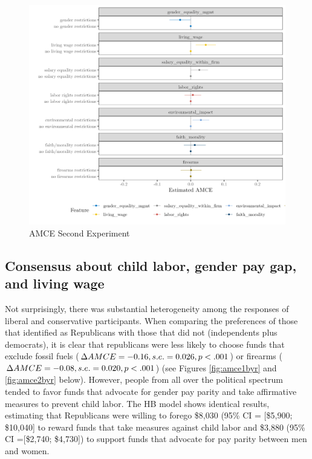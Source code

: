 \documentclass[
  12pt,
]{article}
\begin{document}
\begin{figure}

{\centering \includegraphics{amcecj2jmainb} 

}

\caption{AMCE Second Experiment}\label{fig:amce2cjmain}
\end{figure}

\hypertarget{consensus-about-child-labor-gender-pay-gap-and-living-wage}{%
\subsection{Consensus about child labor, gender pay gap, and living wage}\label{consensus-about-child-labor-gender-pay-gap-and-living-wage}}

Not surprisingly, there was substantial heterogeneity among the responses of liberal and conservative participants. When comparing the preferences of those that identified as Republicans with those that did not (independents plus democrats), it is clear that republicans were less likely to choose funds that exclude fossil fuels (\(\Delta AMCE = -0.16, \space s.e. = 0.026, \space p <.001\)) or firearms (\(\Delta AMCE = -0.08, \space s.e. = 0.020, \space p<.001\)) (see Figures \ref{fig:amce1byr} and \ref{fig:amce2byr} below). However, people from all over the political spectrum tended to favor funds that advocate for gender pay parity and take affirmative measures to prevent child labor. The HB model shows identical results, estimating that Republicans were willing to forego \$8,030 (95\% CI = {[}\$5,900; \$10,040{]} to reward funds that take measures against child labor and \$3,880 (95\% CI ={[}\$2,740; \$4,730{]}) to support funds that advocate for pay parity between men and women.
\end{document}
